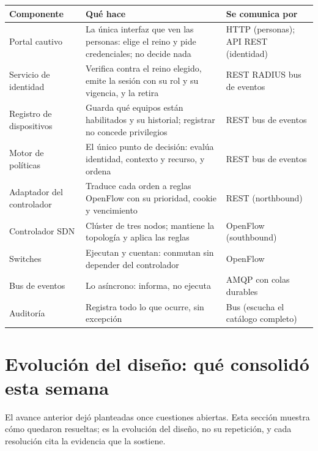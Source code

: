 \documentclass[11pt,a4paper]{article}
\begin{document}
\begin{longtable}{p{2.8cm}p{7.2cm}p{4.4cm}}
\toprule
\textbf{Componente} & \textbf{Qué hace} & \textbf{Se comunica por}\\
\midrule
Portal cautivo & La única interfaz que ven las personas: elige el reino y pide credenciales; no decide nada & HTTP (personas); API REST (identidad)\\
Servicio de identidad & Verifica contra el reino elegido, emite la sesión con su rol y su vigencia, y la retira & REST \textperiodcentered{} RADIUS \textperiodcentered{} bus de eventos\\
Registro de dispositivos & Guarda qué equipos están habilitados y su historial; registrar no concede privilegios & REST \textperiodcentered{} bus de eventos\\
Motor de políticas & El único punto de decisión: evalúa identidad, contexto y recurso, y ordena & REST \textperiodcentered{} bus de eventos\\
Adaptador del controlador & Traduce cada orden a reglas OpenFlow con su prioridad, cookie y vencimiento & REST (northbound)\\
Controlador SDN & Clúster de tres nodos; mantiene la topología y aplica las reglas & OpenFlow (southbound)\\
Switches & Ejecutan y cuentan: conmutan sin depender del controlador & OpenFlow\\
Bus de eventos & Lo asíncrono: informa, no ejecuta & AMQP con colas durables\\
Auditoría & Registra todo lo que ocurre, sin excepción & Bus (escucha el catálogo completo)\\
\bottomrule
\end{longtable}

\section{Evolución del diseño: qué consolidó esta semana}

El avance anterior dejó planteadas once cuestiones abiertas. Esta sección muestra cómo quedaron resueltas; es la evolución del diseño, no su repetición, y cada resolución cita la evidencia que la sostiene.
\end{document}
